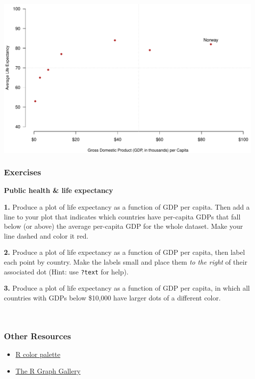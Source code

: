 \documentclass[]{book}
\providecommand{\tightlist}{%
  \setlength{\itemsep}{0pt}\setlength{\parskip}{0pt}}
\begin{document}
\includegraphics{figures/unnamed-chunk-619-1.pdf}

\hypertarget{exercises-19}{%
\subsubsection*{Exercises}\label{exercises-19}}

\textbf{Public health \& life expectancy}

\textbf{1.} Produce a plot of life expectancy as a function of GDP per capita. Then add a line to your plot that indicates which countries have per-capita GDPs that fall below (or above) the average per-capita GDP for the whole dataset. Make your line dashed and color it red.

\textbf{2.} Produce a plot of life expectancy as a function of GDP per capita, then label each point by country. Make the labels small and place them \emph{to the right} of their associated dot (Hint: use \texttt{?text} for help).

\textbf{3.} Produce a plot of life expectancy as a function of GDP per capita, in which all countries with GDPs below \$10,000 have larger dots of a different color.

~

\hypertarget{other-resources-4}{%
\subsubsection*{Other Resources}\label{other-resources-4}}

\begin{itemize}
\tightlist
\item
  \href{http://www.stat.columbia.edu/~tzheng/files/Rcolor.pdf}{R color palette}\\
\item
  \href{https://www.r-graph-gallery.com/}{The R Graph Gallery}
\end{itemize}
\end{document}
